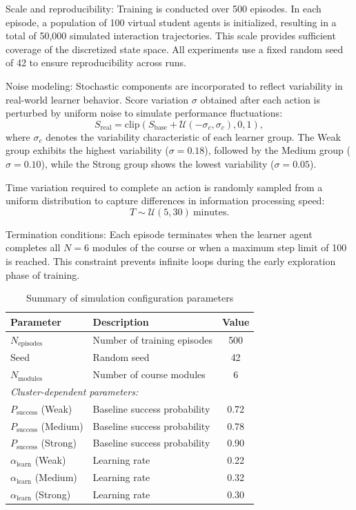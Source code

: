 \documentclass[9pt, conference, a4paper, compsocconf]{IEEEtran}
\begin{document}
Scale and reproducibility: Training is conducted over 500 episodes. In each episode, a population of 100 virtual student agents is initialized, resulting in a total of 50{,}000 simulated interaction trajectories. This scale provides sufficient coverage of the discretized state space. All experiments use a fixed random seed of 42 to ensure reproducibility across runs.

Noise modeling: Stochastic components are incorporated to reflect variability in real-world learner behavior. Score variation $\sigma$ obtained after each action is perturbed by uniform noise to simulate performance fluctuations:
\begin{equation}
S_{\text{real}} = \text{clip}\left(S_{\text{base}} + \mathcal{U}(-\sigma_c, \sigma_c), 0, 1\right),
\end{equation}
where $\sigma_c$ denotes the variability characteristic of each learner group. The Weak group exhibits the highest variability ($\sigma = 0.18$), followed by the Medium group ($\sigma = 0.10$), while the Strong group shows the lowest variability ($\sigma = 0.05$).

Time variation required to complete an action is randomly sampled from a uniform distribution to capture differences in information processing speed:
\begin{equation}
T \sim \mathcal{U}(5, 30) \ \text{minutes}.
\end{equation}


Termination conditions: Each episode terminates when the learner agent completes all $N = 6$ modules of the course or when a maximum step limit of 100 is reached. This constraint prevents infinite loops during the early exploration phase of training.

\begin{table}[htbp]
\caption{Summary of simulation configuration parameters}
\label{tab:sim_params}
\centering
\begin{tabularx}{\columnwidth}{lXc}
\toprule
\textbf{Parameter} & \textbf{Description} & \textbf{Value} \\
\midrule
$N_{\text{episodes}}$ & Number of training episodes & 500 \\
Seed & Random seed & 42 \\
$N_{\text{modules}}$ & Number of course modules & 6 \\
\midrule
\multicolumn{3}{l}{\textit{Cluster-dependent parameters:}} \\
$P_{\text{success}}$ (Weak) & Baseline success probability & 0.72 \\
$P_{\text{success}}$ (Medium) & Baseline success probability & 0.78 \\
$P_{\text{success}}$ (Strong) & Baseline success probability & 0.90 \\
$\alpha_{\text{learn}}$ (Weak) & Learning rate & 0.22 \\
$\alpha_{\text{learn}}$ (Medium) & Learning rate & 0.32 \\
$\alpha_{\text{learn}}$ (Strong) & Learning rate & 0.30 \\
\bottomrule
\end{tabularx}
\end{table}
\end{document}
